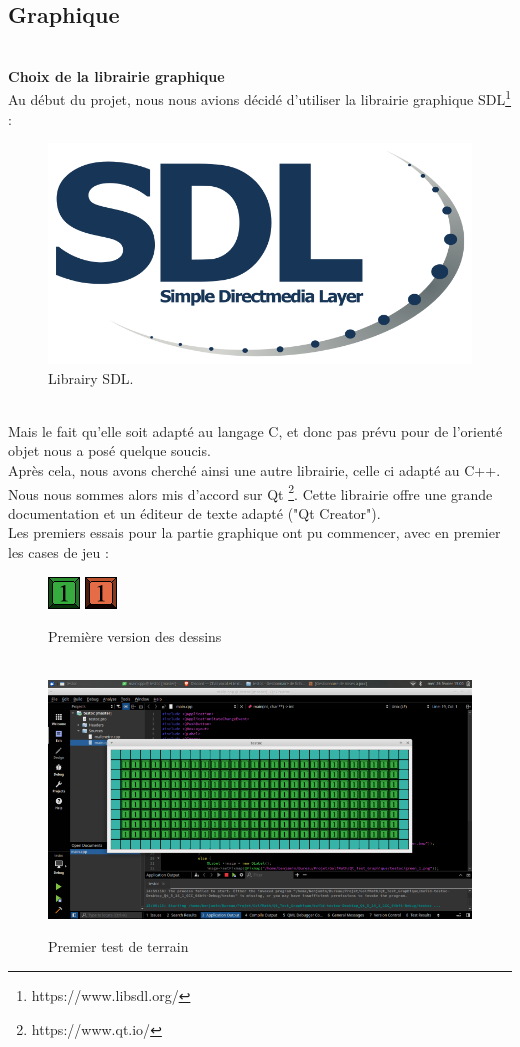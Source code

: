 \documentclass{article}
\begin{document}
\subsection{Graphique}
~\\
\textbf{\large Choix de la librairie graphique}
~\\
Au début du projet, nous nous avions décidé d'utiliser la librairie graphique SDL\footnote{https://www.libsdl.org/} : 
~\\
\begin{figure}[!h]
\centering
\includegraphics[scale=0.2]{Images/logoSDL.png}
\caption{Librairy SDL.}
\end{figure}
~\\
Mais le fait qu'elle soit adapté au langage C, et donc pas prévu pour de l'orienté objet nous a posé quelque soucis.\\
Après cela, nous avons cherché ainsi une autre librairie, celle ci adapté au C++.\\
Nous nous sommes alors mis d'accord sur Qt \footnote{https://www.qt.io/}. Cette librairie offre une grande documentation et un éditeur de texte adapté ("Qt Creator").
~\\
Les premiers essais pour la partie graphique ont pu commencer, avec en premier les cases de jeu : 
\begin{figure}[!h]
\centering
\includegraphics[scale=1]{Images/green_1.jpg}
\includegraphics[scale=1]{Images/start_1.jpg}
\caption{Première version des dessins}
~\\
\includegraphics[scale=0.2]{Images/terrain.jpg}
\caption{Premier test de terrain}
\end{figure}
\end{document}
